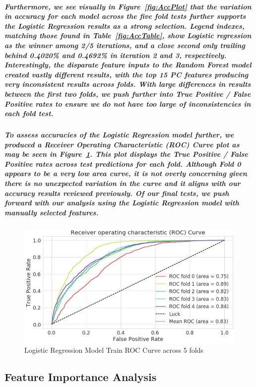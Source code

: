 \documentclass[10pt]{article}
\begin{document}
\subparagraph{Furthermore, we see visually in Figure~\ref{fig:AccPlot} that the variation in accuracy for each model across the five fold tests further supports the Logistic Regression results as a strong selection. Legend indexes, matching those found in Table~\ref{fig:AccTable}, show Logistic regression as the winner among 2/5 iterations, and a close second only trailing behind 0.4020\% and 0.4692\% in iteration 2 and 3, respectively. Interestingly, the disparate feature inputs to the Random Forest model created vastly different results, with the top 15 PC features producing very inconsistent results across folds. With large differences in results between the first two folds, we push further into True Positive / False Positive rates to ensure we do not have too large of inconsistencies in each fold test.}

\subparagraph{To assess accuracies of the Logistic Regression model further, we produced a Receiver Operating Characteristic (ROC) Curve plot as may be seen in Figure~\ref{fig:ROCPlot}. This plot displays the True Positive / False Positive rates across test predictions for each fold. Although Fold 0 appears to be a very low area curve, it is not overly concerning given there is no unexpected variation in the curve and it aligns with our accuracy results reviewed previously. Of our final tests, we push forward with our analysis using the Logistic Regression model with manually selected features.}

\subparagraph{}
\begin{figure}[H]
\centering
\includegraphics[width=\linewidth]{ROCPlot.jpg}
\caption{Logistic Regression Model Train ROC Curve across 5 folds}
\label{fig:ROCPlot}
\end{figure}

\subsection{Feature Importance Analysis}
\end{document}
